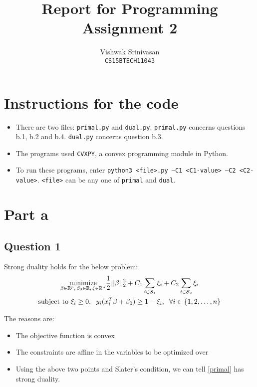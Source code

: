 \documentclass{article}
\title{Report for Programming Assignment 2}
\author{Vishwak Srinivasan\\
\texttt{CS15BTECH11043}}
\date{}
\newcommand{\setS}{\mathcal{S}}
\newcommand{\real}{\mathbb{R}}
\newcommand{\minimize}{\mathop{\mathrm{minimize}}}
\newcommand{\minimizewrt}[1]{\underset{#1}{\minimize}}
\begin{document}
\maketitle

\section*{Instructions for the code}
\begin{itemize}
\item There are two files: \texttt{primal.py} and \texttt{dual.py}. \texttt{primal.py} concerns questions b.1, b.2 and b.4. \texttt{dual.py} concerns question b.3.
\item The programs used \texttt{CVXPY}, a convex programming module in Python.
\item To run these programs, enter \texttt{python3 <file>.py --C1 <C1-value> --C2 <C2-value>}. \texttt{<file>} can be any one of \texttt{primal} and \texttt{dual}.
\end{itemize}

\section*{Part a}
\subsection*{Question 1}
\begin{flushleft}
Strong duality holds for the below problem:
\begin{multline}
\minimizewrt{\beta \in \real^{p}, \hspace{0.5mm} \beta_{0} \in \real, \hspace{0.5mm} \xi \in \real^{n}} \frac{1}{2}||\beta||_{2}^{2} + C_{1}\sum_{i \in \setS_{1}} \xi_{i} + C_{2}\sum_{i \in \setS_{2}} \xi_{i} \\
\text{subject to } \xi_{i} \geq 0, \hspace{2mm} y_{i}(x_{i}^{T}\beta + \beta_{0}) \geq 1 - \xi_{i}, \hspace{2mm} \forall i \in \{1, 2, \ldots, n\}
\label{primal}
\end{multline}

The reasons are:
\begin{itemize}
\item The objective function is convex
\item The constraints are affine in the variables to be optimized over
\item Using the above two points and Slater's condition, we can tell \ref{primal} has strong duality.
\end{itemize}
\end{flushleft}
\end{document}
